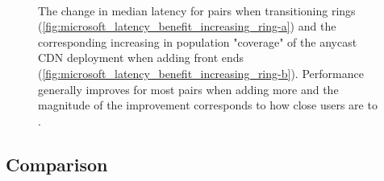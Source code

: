 \documentclass[sigconf,letterpaper,nonacm,10pt,anonymous]{acmart}
\begin{document}
\begin{figure}[]
    \centering
     \\
     \caption{The change in median latency for \metroas pairs when transitioning rings (\ref{fig:microsoft_latency_benefit_increasing_ring-a}) and the corresponding increasing in population "coverage" of the anycast CDN deployment when adding front ends (\ref{fig:microsoft_latency_benefit_increasing_ring-b}). Performance generally improves for most \metroas pairs when adding more \feplural and the magnitude of the improvement corresponds to how close users are to \feplural.}
     \label{fig:microsoft_latency_benefit_increasing_ring}
\end{figure}

\subsection{Comparison}\label{comparison-2}
\end{document}
